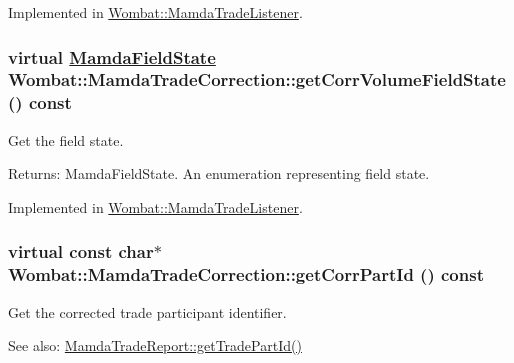 Implemented in \hyperlink{classWombat_1_1MamdaTradeListener_7034a77bc663978a9968c2e9f7a9184c}{Wombat::Mamda\-Trade\-Listener}.\hypertarget{classWombat_1_1MamdaTradeCorrection_bf9f519809865d458b8f8daeb0391eb9}{
\subsubsection[getCorrVolumeFieldState]{\setlength{\rightskip}{0pt plus 5cm}virtual \hyperlink{namespaceWombat_93aac974f2ab713554fd12a1fa3b7d2a}{Mamda\-Field\-State} Wombat::Mamda\-Trade\-Correction::get\-Corr\-Volume\-Field\-State () const}}
\label{classWombat_1_1MamdaTradeCorrection_bf9f519809865d458b8f8daeb0391eb9}


Get the field state. 

\begin{Desc}
\item[Returns:]Mamda\-Field\-State. An enumeration representing field state. \end{Desc}


Implemented in \hyperlink{classWombat_1_1MamdaTradeListener_90012157ba9cf5464d9e03e7a9af9e07}{Wombat::Mamda\-Trade\-Listener}.\hypertarget{classWombat_1_1MamdaTradeCorrection_221aff95289be7e4a10043b045eba11b}{
\subsubsection[getCorrPartId]{\setlength{\rightskip}{0pt plus 5cm}virtual const char$\ast$ Wombat::Mamda\-Trade\-Correction::get\-Corr\-Part\-Id () const}}
\label{classWombat_1_1MamdaTradeCorrection_221aff95289be7e4a10043b045eba11b}


Get the corrected trade participant identifier. 

\begin{Desc}
\item[See also:]\hyperlink{classWombat_1_1MamdaTradeReport_eb865e0b7c57732356d925d532364c7b}{Mamda\-Trade\-Report::get\-Trade\-Part\-Id()} \end{Desc}


